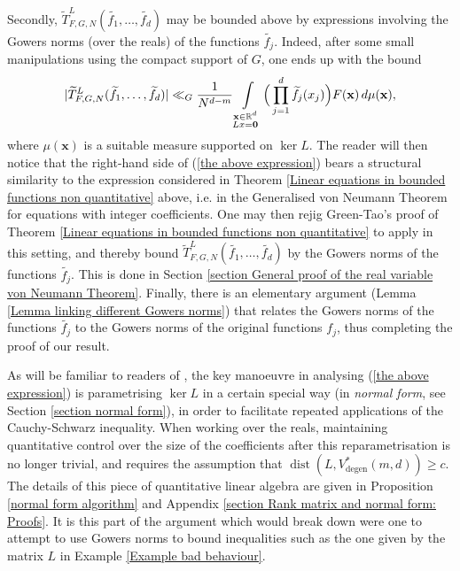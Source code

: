 \documentclass[12pt,a4paper,twoside,reqno]{amsart}
\newcommand{\degen}{\operatorname{degen}}
\newcommand{\dist}{\operatorname{dist}}
\numberwithin{equation}{section}
\begin{document}
 Secondly, $\widetilde{T}_{F,G,N}^L(\widetilde{f_1},\dots,\widetilde{f_d})$ may be bounded above by expressions involving the Gowers norms (over the reals) of the functions $\widetilde{f_j}$. Indeed, after some small manipulations using the compact support of $G$, one ends up with the bound 
 \begin{equation}
 \label{the above expression}\vert\widetilde{T}_{F,G,N}^L(\widetilde{f_1},\dots,\widetilde{f_d}) \vert \ll_G  \frac{1}{N^{d-m}} \int\limits_{ \substack{ \mathbf{x} \in \mathbb{R}^d \\ L\mathbf\mathbf{x} = \mathbf{0}}} \Big(\prod\limits_{j=1}^d \widetilde{f_j} (x_j)\Big) F(\mathbf{x}) \, d \mu(\mathbf{x}),
 \end{equation} where $\mu(\mathbf{x})$ is a suitable measure supported on $\ker L$. The reader will then notice that the right-hand side of (\ref{the above expression}) bears a structural similarity to the expression considered in Theorem \ref{Linear equations in bounded functions non quantitative} above, i.e. in the Generalised von Neumann Theorem for equations with integer coefficients. One may then rejig Green-Tao's proof of Theorem \ref{Linear equations in bounded functions non quantitative} to apply in this setting, and thereby bound $\widetilde{T}_{F,G,N}^L(\widetilde{f_1},\dots,\widetilde{f_d})$ by the Gowers norms of the functions $\widetilde{f_j}$. This is done in Section \ref{section General proof of the real variable von Neumann Theorem}. Finally, there is an elementary argument (Lemma \ref{Lemma linking different Gowers norms}) that relates the Gowers norms of the functions $\widetilde{f_j}$ to the Gowers norms of the original functions $f_j$, thus completing the proof of our result.
 
As will be familiar to readers of \cite{GT10}, the key manoeuvre in analysing (\ref{the above expression}) is parametrising $\ker L$ in a certain special way (in \emph{normal form}, see Section \ref{section normal form}), in order to facilitate repeated applications of the Cauchy-Schwarz inequality. When working over the reals, maintaining quantitative control over the size of the coefficients after this reparametrisation is no longer trivial, and requires the assumption that $\dist(L,V_{\degen}^*(m,d)) \geqslant c$. The details of this piece of quantitative linear algebra are given in Proposition \ref{normal form algorithm} and Appendix \ref{section Rank matrix and normal form: Proofs}. It is this part of the argument which would break down were one to attempt to use Gowers norms to bound inequalities such as the one given by the matrix $L$ in Example \ref{Example bad behaviour}.\\
\end{document}
